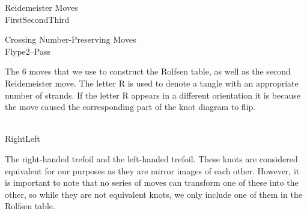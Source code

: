 \begin{paper}
\begin{center}\begin{minipage}{3in}\begin{center}
Reidemeister Moves\vspace{0.5em}
\\
First\hspace{0.14\columnwidth}Second\hspace{0.11\columnwidth}Third\\
\end{center}\end{minipage}\end{center}
\begin{center}\begin{minipage}{3in}\begin{center}
Crossing Number-Preserving Moves\vspace{0.5em}
\\
Flype\hspace{0.225\columnwidth}2--Pass\\
\end{center}\end{minipage}\end{center}
{The 6 moves that we use to construct the Rolfsen table, as well as the second
Reidemeister move.
The letter R is used to denote a tangle with an appropriate number of strands.
If the letter R appears in a different orientation it is because the move caused
the corresponding part of the knot diagram to flip.\\}\\

{\begin{center}\begin{minipage}{3in}\begin{center}
\hfill{}
\begin{center}Right\hspace{0.5\columnwidth}Left\end{center}
\end{center}\end{minipage}\end{center}\vspace{-1.5em}}
{The right-handed trefoil and the left-handed trefoil.
These knots are considered equivalent for our purposes as they are mirror images
of each other.
However, it is important to note that no series of moves can transform one of
these into the other, so while they are not equivalent knots, we only include
one of them in the Rolfsen table.}\\


\end{paper}
